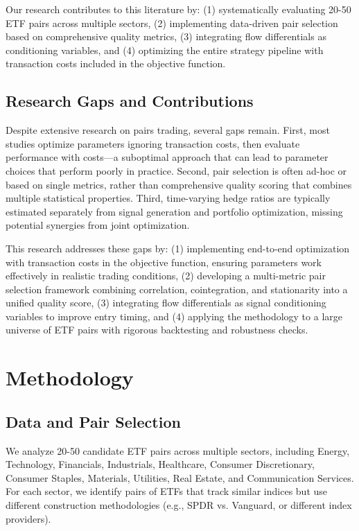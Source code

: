 \documentclass[12pt]{article}
\begin{document}
Our research contributes to this literature by: (1) systematically evaluating 20-50 ETF pairs across multiple sectors, (2) implementing data-driven pair selection based on comprehensive quality metrics, (3) integrating flow differentials as conditioning variables, and (4) optimizing the entire strategy pipeline with transaction costs included in the objective function.

\subsection{Research Gaps and Contributions}

Despite extensive research on pairs trading, several gaps remain. First, most studies optimize parameters ignoring transaction costs, then evaluate performance with costs—a suboptimal approach that can lead to parameter choices that perform poorly in practice. Second, pair selection is often ad-hoc or based on single metrics, rather than comprehensive quality scoring that combines multiple statistical properties. Third, time-varying hedge ratios are typically estimated separately from signal generation and portfolio optimization, missing potential synergies from joint optimization.

This research addresses these gaps by: (1) implementing end-to-end optimization with transaction costs in the objective function, ensuring parameters work effectively in realistic trading conditions, (2) developing a multi-metric pair selection framework combining correlation, cointegration, and stationarity into a unified quality score, (3) integrating flow differentials as signal conditioning variables to improve entry timing, and (4) applying the methodology to a large universe of ETF pairs with rigorous backtesting and robustness checks.

\section{Methodology}

\subsection{Data and Pair Selection}

We analyze 20-50 candidate ETF pairs across multiple sectors, including Energy, Technology, Financials, Industrials, Healthcare, Consumer Discretionary, Consumer Staples, Materials, Utilities, Real Estate, and Communication Services. For each sector, we identify pairs of ETFs that track similar indices but use different construction methodologies (e.g., SPDR vs. Vanguard, or different index providers).
\end{document}

